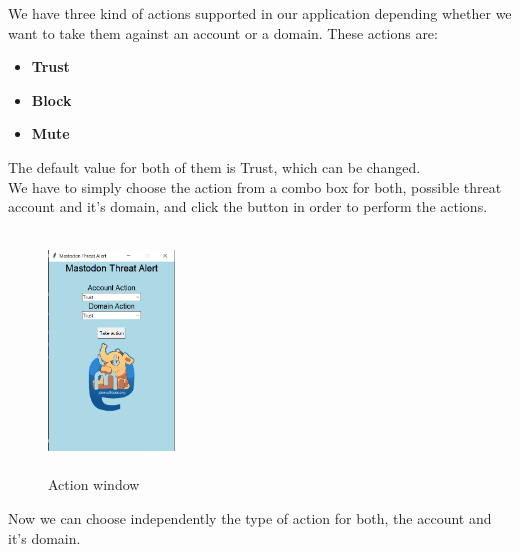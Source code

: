 We have three kind of actions supported in our application depending whether
we want to take them against an account or a domain. These actions are:
\begin{itemize}
	\item \textbf{Trust}
	\item \textbf{Block}
	\item \textbf{Mute}
\end{itemize}
The default value for both of them is Trust,  which can be changed.
\\[5pt]
We have to simply choose the action from a combo box for both, possible threat account and
it's domain, and click the button in order to perform the actions. 
\begin{figure}[H]
	\centering
	\includegraphics[width=0.3\textwidth,height=240px]{images/actionspage.png}
	\caption{Action window}
	\label{fig:action_page}
\end{figure}
Now we can choose independently the type of action for both, the account
and it's domain.
\\[5pt]
